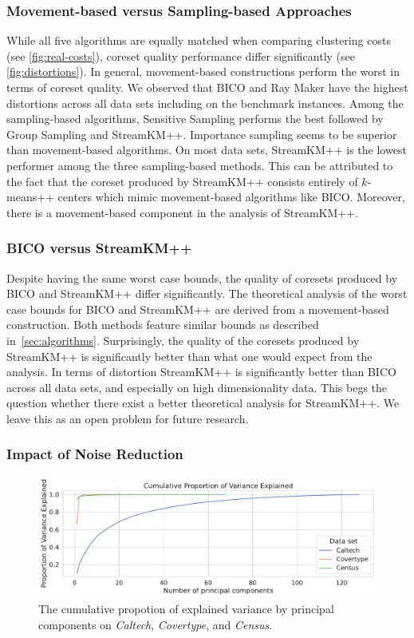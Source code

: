 \subsubsection*{Movement-based versus Sampling-based Approaches}
While all five algorithms are equally matched when comparing clustering costs (see  \cref{fig:real-costs}), coreset quality performance differ significantly (see \cref{fig:distortions}). 
In general, movement-based constructions perform the worst in terms of coreset quality. 
We observed that BICO and Ray Maker have the highest distortions across all data sets including on the benchmark instances. Among the sampling-based algorithms, Sensitive Sampling performs the best followed by Group Sampling and StreamKM++. Importance sampling seems to be superior than movement-based algorithms. On most data sets, StreamKM++ is the lowest performer among the three sampling-based methods. This can be attributed to the fact that the coreset produced by StreamKM++ consists entirely of $k$-means++ centers which mimic movement-based algorithms like BICO. Moreover, there is a movement-based component in the analysis of StreamKM++.





\subsubsection*{BICO versus StreamKM++}
Despite having the same worst case bounds, the quality of coresets produced by BICO and StreamKM++ differ significantly.
The theoretical analysis of the worst case bounds for BICO and StreamKM++ are derived from a movement-based construction. Both methods feature similar bounds as described in~\cref{sec:algorithms}. Surprisingly, the quality of the coresets produced by StreamKM++ is significantly better than what one would expect from the analysis. In terms of distortion StreamKM++ is significantly better than BICO across all data sets, and especially on high dimensionality data. This begs the question whether there exist a better theoretical analysis for StreamKM++. We leave this as an open problem for future research.



\subsubsection*{Impact of Noise Reduction}

\begin{figure}
  \caption{The cumulative propotion of explained variance by principal components on \textit{Caltech}, \textit{Covertype}, and \textit{Census}.}
  \label{fig:explained-variance-pca}
  \includegraphics[width=0.9\linewidth]{figures/explained-variance-plot.pdf}
\end{figure}

